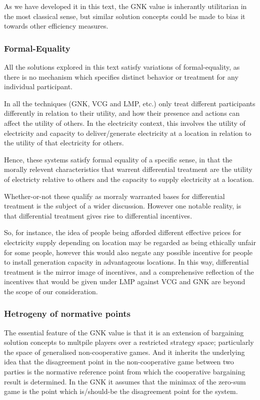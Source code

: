 As we have developed it in this text, the GNK value is inherantly utilitarian in the most classical sense, but similar solution concepts could be made to bias it towards other efficiency measures.

\subsubsection*{Formal-Equality}

All the solutions explored in this text satisfy variations of formal-equality, as there is no mechanism which specifies distinct behavior or treatment for any individual participant.

In all the techniques (GNK, VCG and LMP, etc.) only treat different participants differently in relation to their utility, and how their presence and actions can affect the utility of others.
In the electricity context, this involves the utility of electricity and capacity to deliver/generate electricity at a location in relation to the utility of that electricity for others.

Hence, these systems satisfy formal equality of a specific sense, in that the morally relevent characteristics that warrent differential treatment are the utility of electricty relative to others and the capacity to supply electricity at a location.

Whether-or-not these qualify as morraly warranted bases for differential treatment is the subject of a wider discussion.
However one notable reality, is that differential treatment gives rise to differential incentives.

So, for instance, the idea of people being afforded different effective prices for electricity supply depending on location may be regarded as being ethically unfair for some people, however this would also negate any possible incentive for people to install generation capacity in advantageous locations.
In this way, differential treatment is the mirror image of incentives, and a comprehensive reflection of the incentives that would be given under LMP against VCG and GNK are beyond the scope of our consideration.

\subsubsection*{Hetrogeny of normative points}

The essential feature of the GNK value is that it is an extension of bargaining solution concepts to multpile players over a restricted strategy space; particularly the space of generalised non-cooperative games.
And it inherits the underlying idea that the disagreement point in the non-cooperative game between two parties is the normative reference point from which the cooperative bargaining result is determined.
In the GNK it assumes that the minimax of the zero-sum game is the point which is/should-be the disagreement point for the system.

